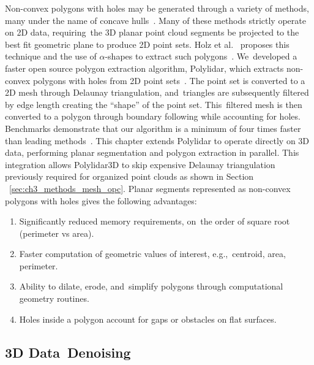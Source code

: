 Non-convex polygons with holes may be generated through a variety of methods, many under the name of concave hulls~\cite{edelsbrunner_shape_1983, furieri_spatialite_2017, open_source_geospatial_foundation_postgis_2019}. Many of these methods strictly operate on 2D data, requiring~the 3D planar point cloud segments be projected to the best fit geometric plane to produce 2D point sets. Holz et al.~\cite{lee_fast_2013} proposes this technique and the use of $\alpha$-shapes to extract such polygons~\cite{edelsbrunner_shape_1983}.  We~developed a faster open source polygon extraction algorithm, Polylidar, which extracts non-convex polygons with holes from 2D point sets~\cite{castagno_polylidar_2020}. The point set is converted to a 2D mesh through Delaunay triangulation, and~triangles are subsequently filtered by edge length creating the ``shape'' of the point set. This~filtered mesh is then converted to a polygon through boundary following while accounting for holes. Benchmarks demonstrate that our algorithm is a minimum of four times faster than leading methods~\cite{polylidar_benchmark_concave}. This chapter extends Polylidar to operate directly on 3D data, performing planar segmentation and polygon extraction in parallel. This integration allows Polylidar3D to skip expensive Delaunay triangulation previously required for organized point clouds as shown in Section ~\ref{sec:ch3_methods_mesh_opc}.  Planar segments represented as non-convex polygons with holes gives the following advantages:

\begin{enumerate}
    \item Significantly reduced memory requirements, on~the order of square root (perimeter vs area).
    \item Faster computation of geometric values of interest, e.g.,~centroid, area, perimeter.
    \item Ability to dilate, erode, and~simplify polygons through computational geometry routines.
    \item Holes inside a polygon account for gaps or obstacles on flat surfaces.
\end{enumerate}

\subsection{3D Data~Denoising}\label{sec:ch3_bg_mesh_smoothing}

